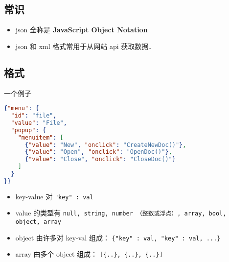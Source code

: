 
\subsection{常识}
\begin{itemize}
\item json 全称是 \textbf{JavaScript Object Notation}
\item json 和 xml 格式常用于从网站 api 获取数据．
\end{itemize}

\subsection{格式}
一个例子
\begin{lstlisting}[language=json]
{"menu": {
  "id": "file",
  "value": "File",
  "popup": {
    "menuitem": [
      {"value": "New", "onclick": "CreateNewDoc()"},
      {"value": "Open", "onclick": "OpenDoc()"},
      {"value": "Close", "onclick": "CloseDoc()"}
    ]
  }
}}
\end{lstlisting}

\begin{itemize}
\item key-value 对 \verb|"key" : val|
\item value 的类型有 \verb|null, string, number （整数或浮点）, array, bool, object, array|
\item object 由许多对 key-val 组成： \verb|{"key" : val, "key" : val, ...}|
\item array 由多个 object 组成： \verb|[{..}, {..}, {..}]|
\end{itemize}
